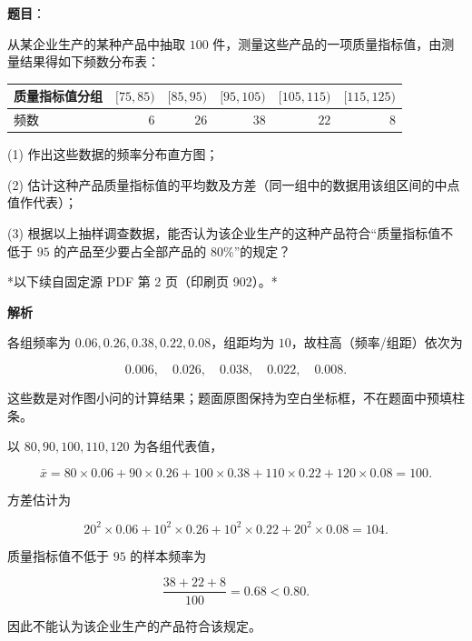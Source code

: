 \begin{answer}

\textbf{题目}：

从某企业生产的某种产品中抽取 $100$ 件，测量这些产品的一项质量指标值，由测量结果得如下频数分布表：

\begin{center}
\begin{tabular}{lrrrrr}
\toprule
质量指标值分组 & $[75,85)$ & $[85,95)$ & $[95,105)$ & $[105,115)$ & $[115,125)$ \\
\midrule
频数 & $6$ & $26$ & $38$ & $22$ & $8$ \\
\bottomrule
\end{tabular}
\end{center}

(1) 作出这些数据的频率分布直方图；
\nopagebreak[4]
\begin{center}\end{center}
\nopagebreak[4]
(2) 估计这种产品质量指标值的平均数及方差（同一组中的数据用该组区间的中点值作代表）；

(3) 根据以上抽样调查数据，能否认为该企业生产的这种产品符合“质量指标值不低于 $95$ 的产品至少要占全部产品的 $80\%$”的规定？

\par\medskip

*以下续自固定源 PDF 第 2 页（印刷页 902）。*

\textbf{解析}


各组频率为 $0.06,0.26,0.38,0.22,0.08$，组距均为 $10$，故柱高（频率/组距）依次为

\nopagebreak[4]
\[
0.006,\quad0.026,\quad0.038,\quad0.022,\quad0.008.
\]

这些数是对作图小问的计算结果；题面原图保持为空白坐标框，不在题面中预填柱条。


以 $80,90,100,110,120$ 为各组代表值，

\nopagebreak[4]
\[
\bar x=80\times0.06+90\times0.26+100\times0.38+110\times0.22+120\times0.08=100.
\]

方差估计为

\nopagebreak[4]
\[
20^2\times0.06+10^2\times0.26+10^2\times0.22+20^2\times0.08=104.
\]


质量指标值不低于 $95$ 的样本频率为

\nopagebreak[4]
\[
\frac{38+22+8}{100}=0.68<0.80.
\]

因此不能认为该企业生产的产品符合该规定。




\end{answer}
